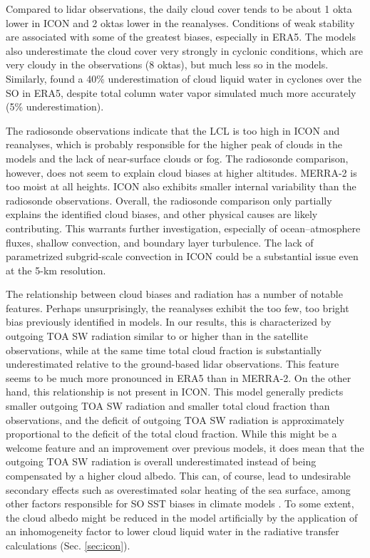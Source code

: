 \documentclass[draft]{agujournal2019}
\begin{document}
Compared to lidar observations, the daily cloud cover tends to be about 1 okta lower in ICON and 2 oktas lower in the reanalyses. Conditions of weak stability are associated with some of the greatest biases, especially in ERA5. The models also underestimate the cloud cover very strongly in cyclonic conditions, which are very cloudy in the observations (8 oktas), but much less so in the models. Similarly,  found a 40\% underestimation of cloud liquid water in cyclones over the SO in ERA5, despite total column water vapor simulated much more accurately (5\% underestimation).

The radiosonde observations indicate that the LCL is too high in ICON and reanalyses, which is probably responsible for the higher peak of clouds in the models and the lack of near-surface clouds or fog. The radiosonde comparison, however, does not seem to explain cloud biases at higher altitudes. MERRA-2 is too moist at all heights. ICON also exhibits smaller internal variability than the radiosonde observations. Overall, the radiosonde comparison only partially explains the identified cloud biases, and other physical causes are likely contributing. This warrants further investigation, especially of ocean--atmosphere fluxes, shallow convection, and boundary layer turbulence. The lack of parametrized subgrid-scale convection in ICON could be a substantial issue even at the 5-km resolution.

The relationship between cloud biases and radiation has a number of notable features. Perhaps unsurprisingly, the reanalyses exhibit the too few, too bright bias previously identified in models. In our results, this is characterized by outgoing TOA SW radiation similar to or higher than in the satellite observations, while at the same time total cloud fraction is substantially underestimated relative to the ground-based lidar observations. This feature seems to be much more pronounced in ERA5 than in MERRA-2. On the other hand, this relationship is not present in ICON. This model generally predicts smaller outgoing TOA SW radiation and smaller total cloud fraction than observations, and the deficit of outgoing TOA SW radiation is approximately proportional to the deficit of the total cloud fraction. While this might be a welcome feature and an improvement over previous models, it does mean that the outgoing TOA SW radiation is overall underestimated instead of being compensated by a higher cloud albedo. This can, of course, lead to undesirable secondary effects such as overestimated solar heating of the sea surface, among other factors responsible for SO SST biases in climate models . To some extent, the cloud albedo might be reduced in the model artificially by the application of an inhomogeneity factor to lower cloud liquid water in the radiative transfer calculations (Sec. \ref{sec:icon}).
\end{document}
